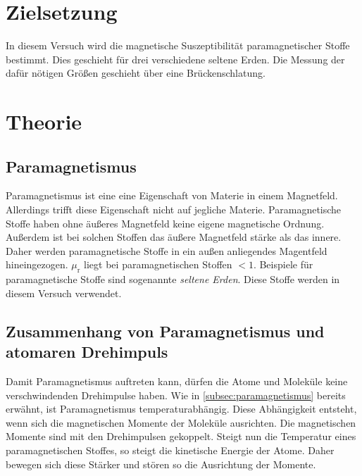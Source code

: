 \section{Zielsetzung}
\label{sec:ziel}
In diesem Versuch wird die magnetische Suszeptibilität paramagnetischer Stoffe bestimmt. Dies geschieht für drei verschiedene seltene Erden. Die Messung der dafür nötigen
Größen geschieht über eine Brückenschlatung.

\section{Theorie}
\label{sec:Theorie}

\subsection{Paramagnetismus}
\label{subsec:paramagnetismus}
Paramagnetismus ist eine eine Eigenschaft von Materie in einem Magnetfeld. Allerdings trifft diese Eigenschaft nicht auf jegliche Materie. Paramagnetische Stoffe haben ohne 
äußeres Magnetfeld keine eigene magnetische Ordnung. Außerdem ist bei solchen Stoffen das äußere Magnetfeld stärke als das innere. Daher werden paramagnetische Stoffe in ein
außen anliegendes Magentfeld hineingezogen. $\mu_{\text{r}}$ liegt bei paramagnetischen Stoffen $ < 1 $. Beispiele für paramagnetische Stoffe sind sogenannte 
\textit{seltene Erden}. Diese Stoffe werden in diesem Versuch verwendet. 

\subsection{Zusammenhang von Paramagnetismus und atomaren Drehimpuls}
\label{subsec:drehimpuls}
Damit Paramagnetismus auftreten kann, dürfen die Atome und Moleküle keine verschwindenden Drehimpulse haben. Wie in \autoref{subsec:paramagnetismus} bereits erwähnt, ist 
Paramagnetismus temperaturabhängig. Diese Abhängigkeit entsteht, wenn sich die magnetischen Momente der Moleküle ausrichten. Die magnetischen Momente sind mit den Drehimpulsen 
gekoppelt. Steigt nun die Temperatur eines paramagnetischen Stoffes, so steigt die kinetische Energie der Atome. Daher bewegen sich diese Stärker und stören so die Ausrichtung
der Momente. 

